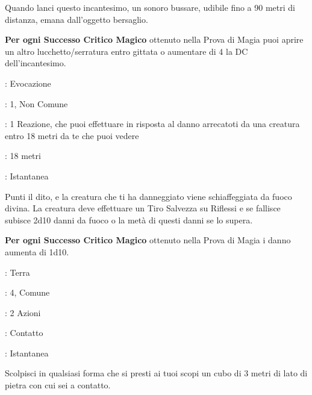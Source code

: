 \begin{multicols}{2}
Quando lanci questo incantesimo, un sonoro bussare, udibile fino a 90 metri di distanza, emana dall'oggetto bersaglio.

\textbf{Per ogni Successo Critico Magico} ottenuto nella Prova di Magia puoi aprire un altro lucchetto/serratura entro gittata o aumentare di 4 la DC dell'incantesimo.

\noindent\colorbox{OBSSgold!10}{
\begin{minipage}{0.95\linewidth}
\begin{description}[noitemsep, topsep=0pt, parsep=0pt, partopsep=0pt, leftmargin=0cm, labelwidth=1.3cm]
	\item[\textbf{Lista}]: Evocazione
	\item[\textbf{Livello}]: 1, Non Comune
	\item[\textbf{Lancio}]: 1 Reazione, che puoi effettuare in risposta al danno arrecatoti da una creatura entro 18 metri da te che puoi vedere
	\item[\textbf{Gittata}]: 18 metri
	\item[\textbf{Durata}]: Istantanea
\end{description}
\end{minipage}}\smallskip

Punti il dito, e la creatura che ti ha danneggiato viene schiaffeggiata da fuoco divina. La creatura deve effettuare un Tiro Salvezza su Riflessi e se fallisce subisce 2d10 danni da fuoco o la metà di questi danni se lo supera.

\textbf{Per ogni Successo Critico Magico} ottenuto nella Prova di Magia i danno aumenta di 1d10.



\noindent\colorbox{OBSSgold!10}{
\begin{minipage}{0.95\linewidth}
\begin{description}[noitemsep, topsep=0pt, parsep=0pt, partopsep=0pt, leftmargin=0cm, labelwidth=1.3cm]
	\item[\textbf{Lista}]: Terra
	\item[\textbf{Livello}]: 4, Comune
	\item[\textbf{Lancio}]: 2 Azioni
	\item[\textbf{Gittata}]: Contatto
	\item[\textbf{Durata}]: Istantanea
\end{description}
\end{minipage}}\smallskip

Scolpisci in qualsiasi forma che si presti ai tuoi scopi un cubo di 3 metri di lato di pietra con cui sei a contatto.


\end{multicols}
